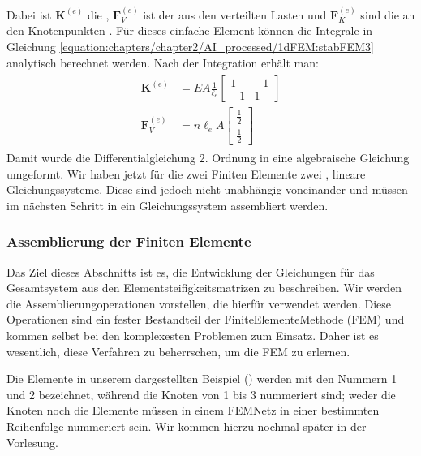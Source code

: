 \documentclass[letterpaper,10pt,german]{jupyterBook}
\begin{document}
\sphinxAtStartPar
Dabei ist \(\bm{K}^{(e)}\) die , \(\bm{F}_V^{(e)}\) ist der  aus den verteilten Lasten und \(\bm{F}_K^{(e)}\) sind die an den Knotenpunkten . Für dieses einfache Element können die Integrale in Gleichung \eqref{equation:chapters/chapter2/AI_processed/1dFEM:stabFEM3} analytisch berechnet werden. Nach der Integration erhält man:
\begin{equation}\label{equation:chapters/chapter2/1dFEM:stabFEM4}
\begin{split}\begin{align}
 \bm{K}^{(e)} & = EA \frac{1}{\ell_e} \begin{bmatrix} 1 & -1 \\ -1 & 1\end{bmatrix} \\
 \bm{F}_V^{(e)} & = n \ell_e A  \begin{bmatrix} \frac{1}{2} \\ \frac{1}{2} \end{bmatrix} 
\end{align}\end{split}
\end{equation}
\sphinxAtStartPar
Damit wurde die Differentialgleichung 2. Ordnung in eine algebraische Gleichung umgeformt. Wir haben jetzt für die zwei Finiten Elemente zwei , lineare Gleichungssysteme. Diese sind jedoch nicht unabhängig voneinander und müssen im nächsten Schritt in ein  Gleichungssystem assembliert werden.


\subsubsection{Assemblierung der Finiten Elemente}
\label{\detokenize{chapters/chapter2/1dFEM:assemblierung-der-finiten-elemente}}
\sphinxAtStartPar
Das Ziel dieses Abschnitts ist es, die Entwicklung der Gleichungen für das Gesamtsystem aus den Elementsteifigkeitsmatrizen zu beschreiben. Wir werden die Assemblierungoperationen vorstellen, die hierfür verwendet werden. Diese Operationen sind ein fester Bestandteil der Finite\sphinxhyphen{}Elemente\sphinxhyphen{}Methode (FEM) und kommen selbst bei den komplexesten Problemen zum Einsatz. Daher ist es wesentlich, diese Verfahren zu beherrschen, um die FEM zu erlernen.

\sphinxAtStartPar
Die Elemente in unserem dargestellten Beispiel () werden mit den Nummern 1 und 2 bezeichnet, während die Knoten von 1 bis 3 nummeriert sind; weder die Knoten noch die Elemente müssen in einem FEM\sphinxhyphen{}Netz in einer bestimmten Reihenfolge nummeriert sein. Wir kommen hierzu nochmal später in der Vorlesung.
\end{document}
